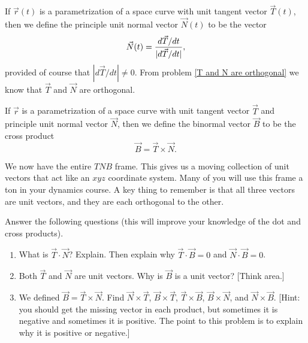 \begin{definition}
 If $\vec r(t)$ is a parametrization of a space curve with unit tangent vector $\vec T(t)$, then we define the principle unit normal vector $\vec N(t)$ to be the vector
 $$\vec N(t) = \displaystyle\frac{d\vec T/dt}{|d\vec T/dt|},$$
 provided of course that $|d\vec T/dt|\neq 0$. 
 From problem \ref{T and N are orthogonal} we know that $\vec T$ and $\vec N$ are orthogonal.
\end{definition}

\begin{definition}
 If $\vec r$ is a parametrization of a space curve with unit tangent vector $\vec T$ and principle unit normal vector $\vec N$, then we define the binormal vector $\vec B$ to be the cross product
$$\vec B = \vec T\times \vec N.$$
\end{definition}

We now have the entire $TNB$ frame.  This gives us a moving collection of unit vectors that act like an $xyz$ coordinate system.  Many of you will use this frame a ton in your dynamics course.  A key thing to remember is that all three vectors are unit vectors, and they are each orthogonal to the other.

\begin{problem}
Answer the following questions (this will improve your knowledge of the dot and cross products).
\begin{enumerate}
 \item What is $\vec T\cdot \vec N$? Explain. Then explain why $\vec T\cdot \vec B=0$ and $\vec N\cdot \vec B=0$.
 \item Both $\vec T$ and $\vec N$ are unit vectors. Why is $\vec B$ is a unit vector? [Think area.] 
 \item We defined $\vec B=\vec T\times \vec N$. Find $\vec N\times \vec T$, $\vec B\times \vec T$, $\vec T\times \vec B$, $\vec B\times \vec N$, and $\vec N\times \vec B$. [Hint: you should get the missing vector in each product, but sometimes it is negative and sometimes it is positive.  The point to this problem is to explain why it is positive or negative.]
\end{enumerate}
\end{problem}

